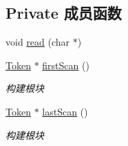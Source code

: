 \subsection*{Private 成员函数}
\begin{DoxyCompactItemize}
\item 
void \hyperlink{class_lexer_abb0f5b7f1e6fd685c8c8e9074553c67f}{read} (char $\ast$)
\item 
\mbox{\label{class_lexer_aa5f52af80cfc8de7841d2ac6bc736662}} 
\hyperlink{class_token}{Token} $\ast$ \hyperlink{class_lexer_aa5f52af80cfc8de7841d2ac6bc736662}{first\+Scan} ()
\begin{DoxyCompactList}\small\item\em 构建根块 \end{DoxyCompactList}\item 
\mbox{\label{class_lexer_a28eb3e3a349bcbc7a0b03e16bb42192f}} 
\hyperlink{class_token}{Token} $\ast$ \hyperlink{class_lexer_a28eb3e3a349bcbc7a0b03e16bb42192f}{last\+Scan} ()
\begin{DoxyCompactList}\small\item\em 构建根块 \end{DoxyCompactList}\end{DoxyCompactItemize}

